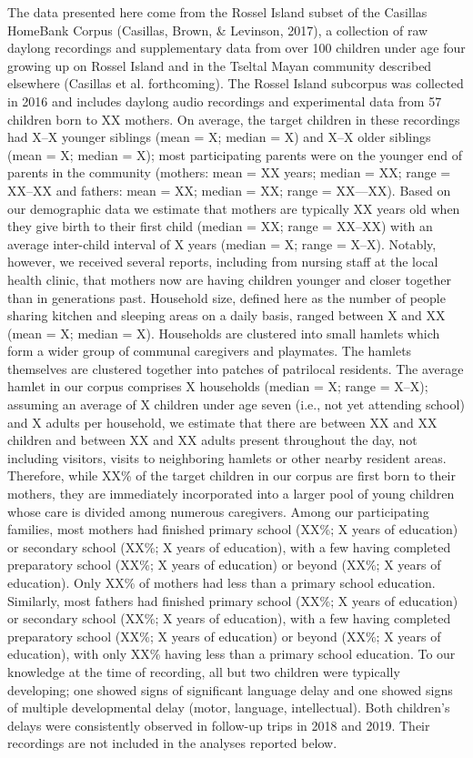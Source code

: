\documentclass[,man,floatsintext]{apa6}
\begin{document}
The data presented here come from the Rossel Island subset of the
Casillas HomeBank Corpus (Casillas, Brown, \& Levinson, 2017), a
collection of raw daylong recordings and supplementary data from over
100 children under age four growing up on Rossel Island and in the
Tseltal Mayan community described elsewhere (Casillas et al.
forthcoming). The Rossel Island subcorpus was collected in 2016 and
includes daylong audio recordings and experimental data from 57 children
born to XX mothers. On average, the target children in these recordings
had X--X younger siblings (mean = X; median = X) and X--X older siblings
(mean = X; median = X); most participating parents were on the younger
end of parents in the community (mothers: mean = XX years; median = XX;
range = XX--XX and fathers: mean = XX; median = XX; range = XX---XX).
Based on our demographic data we estimate that mothers are typically XX
years old when they give birth to their first child (median = XX; range
= XX--XX) with an average inter-child interval of X years (median = X;
range = X--X). Notably, however, we received several reports, including
from nursing staff at the local health clinic, that mothers now are
having children younger and closer together than in generations past.
Household size, defined here as the number of people sharing kitchen and
sleeping areas on a daily basis, ranged between X and XX (mean = X;
median = X). Households are clustered into small hamlets which form a
wider group of communal caregivers and playmates. The hamlets themselves
are clustered together into patches of patrilocal residents. The average
hamlet in our corpus comprises X households (median = X; range = X--X);
assuming an average of X children under age seven (i.e., not yet
attending school) and X adults per household, we estimate that there are
between XX and XX children and between XX and XX adults present
throughout the day, not including visitors, visits to neighboring
hamlets or other nearby resident areas. Therefore, while XX\% of the
target children in our corpus are first born to their mothers, they are
immediately incorporated into a larger pool of young children whose care
is divided among numerous caregivers. Among our participating families,
most mothers had finished primary school (XX\%; X years of education) or
secondary school (XX\%; X years of education), with a few having
completed preparatory school (XX\%; X years of education) or beyond
(XX\%; X years of education). Only XX\% of mothers had less than a
primary school education. Similarly, most fathers had finished primary
school (XX\%; X years of education) or secondary school (XX\%; X years
of education), with a few having completed preparatory school (XX\%; X
years of education) or beyond (XX\%; X years of education), with only
XX\% having less than a primary school education. To our knowledge at
the time of recording, all but two children were typically developing;
one showed signs of significant language delay and one showed signs of
multiple developmental delay (motor, language, intellectual). Both
children's delays were consistently observed in follow-up trips in 2018
and 2019. Their recordings are not included in the analyses reported
below.
\end{document}

